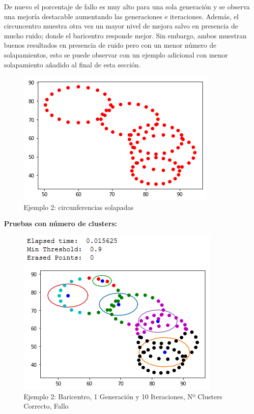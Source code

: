 \documentclass[conference,a4paper]{IEEEtran}
\begin{document}
De nuevo el porcentaje de fallo es muy alto para una sola generación y se observa una mejoría destacable aumentando las generaciones e iteraciones. Además, el circuncentro muestra otra vez un mayor nivel de mejora salvo en presencia de mucho ruido; donde el baricentro responde mejor. Sin embargo, ambos muestran buenos resultados en presencia de ruido pero con un menor número de solapamientos, esto se puede observar con un ejemplo adicional con menor solapamiento añadido al final de esta sección.

\begin{figure}[H]
\centering
\includegraphics[scale=0.65]{Experimentacion/Ejemplo2/Ejemplo2}
\caption{Ejemplo 2: circunferencias solapadas}
\end{figure}


\textbf{Pruebas con número de clusters:}\\

\begin{figure}[H]
\centering
\includegraphics[scale=0.65]{Experimentacion/Ejemplo2/ej2_b_1_10_cc_wrong}
\caption{Ejemplo 2: Baricentro, 1 Generación y 10 Iteraciones,  Nº Clusters Correcto, Fallo\\}
\end{figure}
\end{document}
